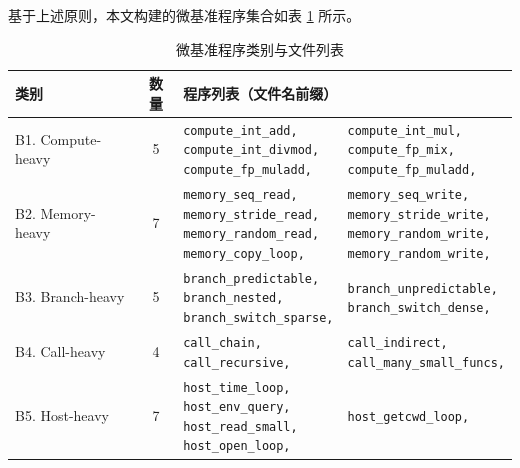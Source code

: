 基于上述原则，本文构建的微基准程序集合如表 \ref{tab:microbenchmarks} 所示。


\begin{table}[htbp]
\centering
\caption{微基准程序类别与文件列表}
\label{tab:microbenchmarks}
\footnotesize %
\begin{tabular}{@{}l c l l@{}}
\toprule
    类别 & 数量 & \multicolumn{2}{l}{程序列表（文件名前缀）} \\
\midrule

B1. Compute-heavy & 5 &
\makecell[tl]{\texttt{compute\_int\_add,} \\
\texttt{compute\_int\_divmod,} \\
\texttt{compute\_fp\_muladd,}} &
\makecell[tl]{\texttt{compute\_int\_mul,} \\
\texttt{compute\_fp\_mix,} \\
\texttt{compute\_fp\_muladd,}} \\
\addlinespace
B2. Memory-heavy & 7 &
\makecell[tl]{\texttt{memory\_seq\_read,} \\
\texttt{memory\_stride\_read,} \\
\texttt{memory\_random\_read,} \\
\texttt{memory\_copy\_loop,}} &
\makecell[tl]{\texttt{memory\_seq\_write,} \\
\texttt{memory\_stride\_write,} \\
\texttt{memory\_random\_write,} \\
\texttt{memory\_random\_write,}} \\
\addlinespace
B3. Branch-heavy & 5 &
\makecell[tl]{\texttt{branch\_predictable,} \\
\texttt{branch\_nested,} \\
\texttt{branch\_switch\_sparse,}} &
\makecell[tl]{\texttt{branch\_unpredictable,} \\
\texttt{branch\_switch\_dense,}} \\
\addlinespace
B4. Call-heavy & 4 &
\makecell[tl]{\texttt{call\_chain,} \\
\texttt{call\_recursive,}} &
\makecell[tl]{\texttt{call\_indirect,} \\
\texttt{call\_many\_small\_funcs,}} \\
\addlinespace
B5. Host-heavy & 7 &
\makecell[tl]{\texttt{host\_time\_loop,} \\
\texttt{host\_env\_query,} \\
\texttt{host\_read\_small,} \\
\texttt{host\_open\_loop,}} &
\makecell[tl]{\texttt{host\_getcwd\_loop,} \\
}
\end{tabular}
\end{table}
